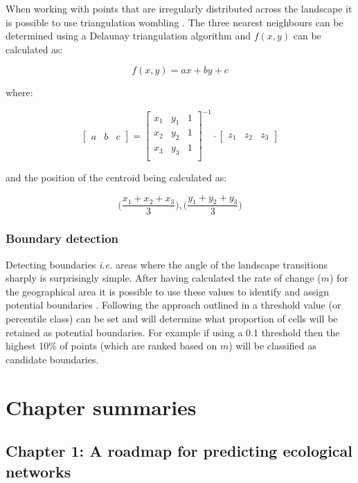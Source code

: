 When working with points that are irregularly distributed across the 
landscape it is possible to use triangulation wombling 
\cite{Fortin1995DelEco}. The three nearest
neighbours can be determined using a Delaunay triangulation algorithm
\cite{Delaunay1934SphVid} and $f(x,y)$ can be calculated as:

$$f(x,y) = ax + by + c$$

where:

$$ \left[ \begin{array}{ccc} a & b & c \end{array} \right] = 
\left[ {\begin{array}{ccc}
   x_{1} & y_{1} & 1\\
   x_{2} & y_{2} & 1\\
   x_{3} & y_{3} & 1\\
  \end{array} } \right]^{-1}\cdot
  \left[
  \begin{array}{ccc} z_{1} & z_{2} & z_{3} \end{array} \right]$$

and the position of the centroid being calculated as:

$$ \Big( \frac{x_{1} + x_{2} + x_{3}}{3} \Big), \Big( \frac{y_{1} + y_{2} +
y_{3}}{3} \Big) $$

\subsubsection{Boundary detection}

Detecting boundaries \emph{i.e.} areas where the angle of the landscape
transitions sharply is surprisingly simple. After having calculated the
rate of change (\(m\)) for the geographical area it is possible to use
these values to identify and assign potential boundaries
\cite{Fortin2005SpaAna, Oden1993CatWom, Fortin1995DelEco}. Following the
approach outlined in \cite{Fortin2005SpaAna} a threshold value (or
percentile class) can be set and will determine what proportion of cells
will be retained as potential boundaries. For example if using a 0.1
threshold then the highest 10\% of points (which are ranked based on 
\(m\)) will be classified as candidate boundaries.

\section{Chapter summaries}

\subsection{Chapter 1: A roadmap for predicting ecological networks}

